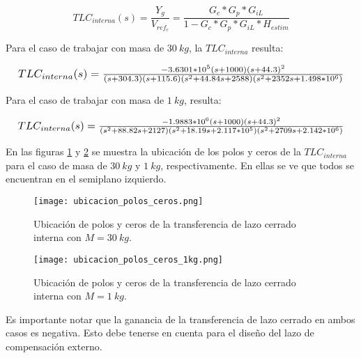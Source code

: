 \begin{equation}
	TLC_{interna}(s)=\frac{Y_g}{V_{ref_c}}=\frac{G_c*G_{p}*G_{iL}}{1-G_c*G_{p}*G_{iL}*H_{estim}}
\end{equation}

Para el caso de trabajar con masa de $30\:kg$, la $TLC_{interna}$ resulta:

\begin{equation*}
	\resizebox{.99\hsize}{!}
	{
		$
		TLC_{interna}(s)=\frac{-3.6301*10^5(s+1000)(s+44.3)^2}{(s+304.3) (s+115.6) (s^2 + 44.84s + 2588) (s^2 + 2352s + 1.498*10^6)}
		$
	}
\end{equation*}


Para el caso de trabajar con masa de $1\:kg$, resulta:


\begin{equation*}
	\resizebox{.99\hsize}{!}
	{
		$
		TLC_{interna}(s)=\frac{-1.9883*10^6 (s+1000) (s+44.3)^2}{(s^2 + 88.82s + 2127) (s^2 + 18.19s + 2.117*10^5) (s^2 + 2709s + 2.142*10^6)}	
		$
	}
\end{equation*}



En las figuras \ref{fig:ubicacion_polos_y_ceros} y \ref{fig:ubicacion_polos_y_ceros_1kg} se muestra la ubicación de los polos y ceros de la $TLC_{interna}$ para el caso de masa de $30\:kg$ y $1\:kg$, respectivamente. En ellas se ve que todos se encuentran en el semiplano izquierdo. 

\begin{figure}[H]
	\centering
	\texttt{[image: ubicacion\_polos\_ceros.png]}
	\caption{Ubicación de polos y ceros de la transferencia de lazo cerrado interna con $M=30\:kg$.}
	\label{fig:ubicacion_polos_y_ceros}
\end{figure}

\begin{figure}[H]
	\centering
	\texttt{[image: ubicacion\_polos\_ceros\_1kg.png]}
	\caption{Ubicación de polos y ceros de la transferencia de lazo cerrado interna con $M=1\:kg$.}
	\label{fig:ubicacion_polos_y_ceros_1kg}
\end{figure}


Es importante notar que la ganancia de la transferencia de lazo cerrado en ambos casos es negativa. Esto debe tenerse en cuenta para el diseño del lazo de compensación externo.


%
%

